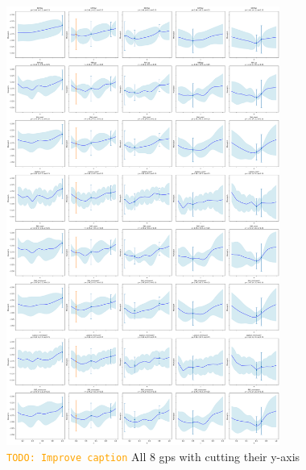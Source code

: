 \documentclass[10pt]{article}
\newcommand{\todo}[1]{\textcolor{orange}{\texttt{TODO: #1}}}
\begin{document}
\begin{figure}[H]
    \centering
    \includegraphics[width=0.8\textwidth]{LatexPlots/final_gps_plots/final_gps_ycuts.png}
    \caption{\todo{Improve caption} All 8 gps with cutting their y-axis}
    \label{fig:best8_ycuts}
\end{figure}
\end{document}
